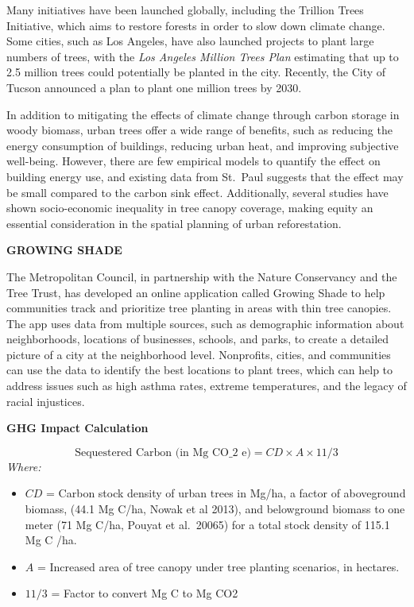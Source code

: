 \documentclass[
]{book}
\providecommand{\tightlist}{%
  \setlength{\itemsep}{0pt}\setlength{\parskip}{0pt}}
\begin{document}
Many initiatives have been launched globally, including the Trillion Trees Initiative, which aims to restore forests in order to slow down climate change. Some cities, such as Los Angeles, have also launched projects to plant large numbers of trees, with the \emph{Los Angeles Million Trees Plan} estimating that up to 2.5 million trees could potentially be planted in the city. Recently, the City of Tucson announced a plan to plant one million trees by 2030.

In addition to mitigating the effects of climate change through carbon storage in woody biomass, urban trees offer a wide range of benefits, such as reducing the energy consumption of buildings, reducing urban heat, and improving subjective well-being. However, there are few empirical models to quantify the effect on building energy use, and existing data from St.~Paul suggests that the effect may be small compared to the carbon sink effect. Additionally, several studies have shown socio-economic inequality in tree canopy coverage, making equity an essential consideration in the spatial planning of urban reforestation.

\textbf{GROWING SHADE}

The Metropolitan Council, in partnership with the Nature Conservancy and the Tree Trust, has developed an online application called Growing Shade to help communities track and prioritize tree planting in areas with thin tree canopies. The app uses data from multiple sources, such as demographic information about neighborhoods, locations of businesses, schools, and parks, to create a detailed picture of a city at the neighborhood level. Nonprofits, cities, and communities can use the data to identify the best locations to plant trees, which can help to address issues such as high asthma rates, extreme temperatures, and the legacy of racial injustices.

\textbf{GHG Impact Calculation}

\[ \text{Sequestered Carbon (in Mg CO_2 e)} = CD × A × 11/3 \]
\emph{Where:}

\begin{itemize}
\tightlist
\item
  \(CD\) = Carbon stock density of urban trees in Mg/ha, a factor of aboveground biomass, (44.1 Mg C/ha, Nowak et al 2013), and belowground biomass to one meter (71 Mg C/ha, Pouyat et al.~20065) for a total stock density of 115.1 Mg C /ha.
\item
  \(A\) = Increased area of tree canopy under tree planting scenarios, in hectares.
\item
  \(11/3\) = Factor to convert Mg C to Mg CO2
\end{itemize}
\end{document}
